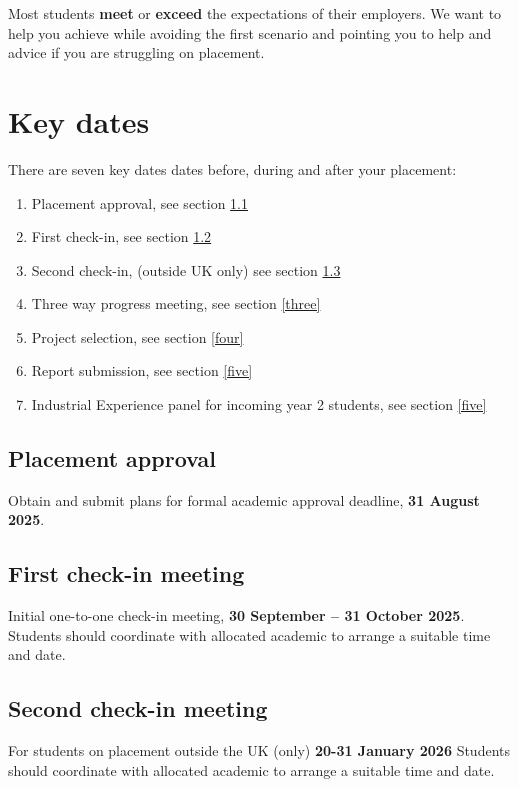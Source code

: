 \documentclass[
]{book}
\providecommand{\tightlist}{%
  \setlength{\itemsep}{0pt}\setlength{\parskip}{0pt}}
\begin{document}
Most students \textbf{meet} or \textbf{exceed} the expectations of their employers. We want to help you achieve while avoiding the first scenario and pointing you to help and advice if you are struggling on placement.

\section{Key dates}\label{keydates}

There are seven key dates dates before, during and after your placement:

\begin{enumerate}
\def\labelenumi{\arabic{enumi}.}
\tightlist
\item
  Placement approval, see section \ref{approval}
\item
  First check-in, see section \ref{one}
\item
  Second check-in, (outside UK only) see section \ref{two}
\item
  Three way progress meeting, see section \ref{three}
\item
  Project selection, see section \ref{four}
\item
  Report submission, see section \ref{five}
\item
  Industrial Experience panel for incoming year 2 students, see section \ref{five}
\end{enumerate}

\subsection{Placement approval}\label{approval}

Obtain and submit plans for formal academic approval deadline, \textbf{31 August 2025}.

\subsection{First check-in meeting}\label{one}

Initial one-to-one check-in meeting, \textbf{30 September -- 31 October 2025}. Students should coordinate with allocated academic to arrange a suitable time and date.

\subsection{Second check-in meeting}\label{two}

For students on placement outside the UK (only) \textbf{20-31 January 2026} Students should coordinate with allocated academic to arrange a suitable time and date.
\end{document}
